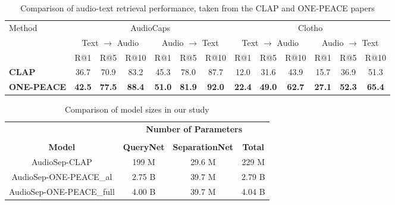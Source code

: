 \documentclass[11pt]{article}
\begin{document}
\begin{table}[ht]
\centering
\label{tab:audio_text_retrieval}
    \begin{tabular}{lcccccccccccc}
        \toprule
        \multirow{2}{*}{Method} & \multicolumn{6}{c}{AudioCaps} & \multicolumn{6}{c}{Clotho} \\
        \cmidrule(lr){2-7} \cmidrule(lr){8-13}
         & \multicolumn{3}{c}{Text $\to$ Audio} & \multicolumn{3}{c}{Audio $\to$ Text} & \multicolumn{3}{c}{Text $\to$ Audio} & \multicolumn{3}{c}{Audio $\to$ Text} \\
        \cmidrule(lr){2-4} \cmidrule(lr){5-7} \cmidrule(lr){8-10} \cmidrule(lr){11-13}
         & R@1 & R@5 & R@10 & R@1 & R@5 & R@10 & R@1 & R@5 & R@10 & R@1 & R@5 & R@10 \\
        \midrule

        \textbf{CLAP} & 36.7 & 70.9 & 83.2 & 45.3 & 78.0 & 87.7 & 12.0 & 31.6 & 43.9 & 15.7 & 36.9 & 51.3 \\

        
        \textbf{ONE-PEACE} & \textbf{42.5} & \textbf{77.5} & \textbf{88.4} & \textbf{51.0} & \textbf{81.9} & \textbf{92.0} & \textbf{22.4} & \textbf{49.0} & \textbf{62.7} & \textbf{27.1} & \textbf{52.3} & \textbf{65.4} \\
        \bottomrule
    \end{tabular}
    
    \caption{Comparison of audio-text retrieval performance, taken from the CLAP and ONE-PEACE papers}
\end{table}


\begin{table}
  \centering
  \begin{tabular}{cccc}
                               & \multicolumn{3}{c}{\textbf{Number of Parameters}} \\
    \cline{2-4}
    \vspace{0.25mm} \\  
    \textbf{Model}             & \textbf{QueryNet}  & \textbf{SeparationNet} & \textbf{Total} \\
    \hline
    AudioSep-CLAP              &  199 M             &  29.6 M                & 229 M          \\
    AudioSep-ONE-PEACE\_al     &  2.75 B            &  39.7 M                & 2.79 B         \\
    AudioSep-ONE-PEACE\_full   &  4.00  B           &  39.7 M                & 4.04 B         \\
    \hline
  \end{tabular}
  \caption{Comparison of model sizes in our study}
\end{table}
\end{document}
